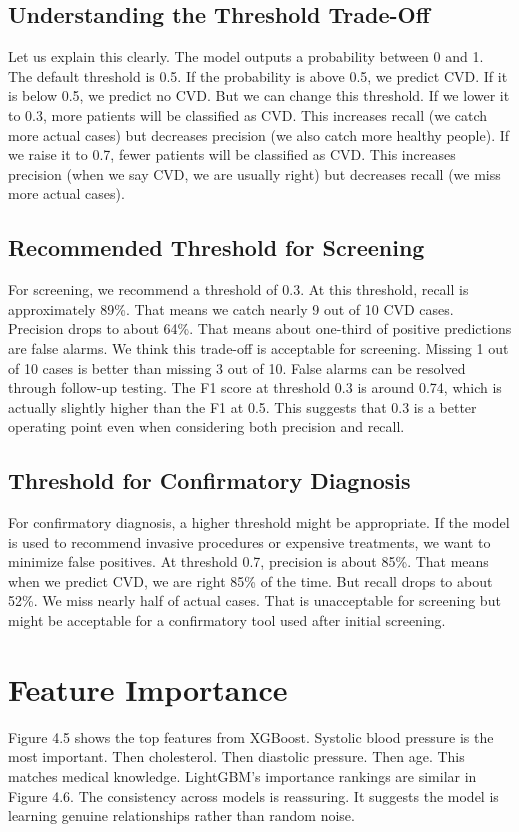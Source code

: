 \documentclass[12pt, a4paper, oneside]{book}
\begin{document}
\subsection{Understanding the Threshold Trade-Off}
Let us explain this clearly. The model outputs a probability between 0 and 1. The default threshold is 0.5. If the probability is above 0.5, we predict CVD. If it is below 0.5, we predict no CVD. But we can change this threshold. If we lower it to 0.3, more patients will be classified as CVD. This increases recall (we catch more actual cases) but decreases precision (we also catch more healthy people). If we raise it to 0.7, fewer patients will be classified as CVD. This increases precision (when we say CVD, we are usually right) but decreases recall (we miss more actual cases).

\subsection{Recommended Threshold for Screening}
For screening, we recommend a threshold of 0.3. At this threshold, recall is approximately 89\%. That means we catch nearly 9 out of 10 CVD cases. Precision drops to about 64\%. That means about one-third of positive predictions are false alarms. We think this trade-off is acceptable for screening. Missing 1 out of 10 cases is better than missing 3 out of 10. False alarms can be resolved through follow-up testing. The F1 score at threshold 0.3 is around 0.74, which is actually slightly higher than the F1 at 0.5. This suggests that 0.3 is a better operating point even when considering both precision and recall.

\subsection{Threshold for Confirmatory Diagnosis}
For confirmatory diagnosis, a higher threshold might be appropriate. If the model is used to recommend invasive procedures or expensive treatments, we want to minimize false positives. At threshold 0.7, precision is about 85\%. That means when we predict CVD, we are right 85\% of the time. But recall drops to about 52\%. We miss nearly half of actual cases. That is unacceptable for screening but might be acceptable for a confirmatory tool used after initial screening.

\section{Feature Importance}
Figure 4.5 shows the top features from XGBoost. Systolic blood pressure is the most important. Then cholesterol. Then diastolic pressure. Then age. This matches medical knowledge. LightGBM's importance rankings are similar in Figure 4.6. The consistency across models is reassuring. It suggests the model is learning genuine relationships rather than random noise.
\end{document}
